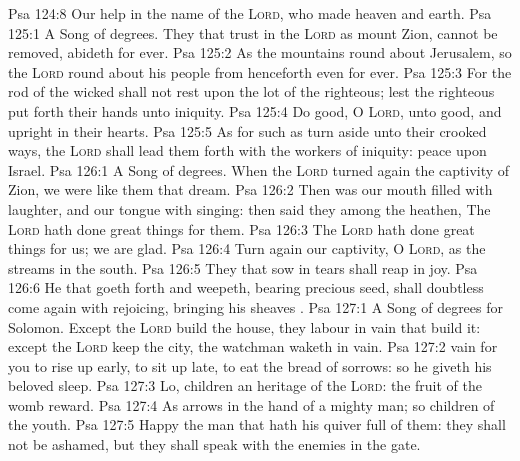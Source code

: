 \vs Psa 124:8 Our help  in the name of the \textsc{Lord}, who made heaven and earth.
\vs Psa 125:1 A Song of degrees. They that trust in the \textsc{Lord}  as mount Zion,  cannot be removed,  abideth for ever.
\vs Psa 125:2 As the mountains  round about Jerusalem, so the \textsc{Lord}  round about his people from henceforth even for ever.
\vs Psa 125:3 For the rod of the wicked shall not rest upon the lot of the righteous; lest the righteous put forth their hands unto iniquity.
\vs Psa 125:4 Do good, O \textsc{Lord}, unto  good, and  upright in their hearts.
\vs Psa 125:5 As for such as turn aside unto their crooked ways, the \textsc{Lord} shall lead them forth with the workers of iniquity:  peace  upon Israel.
\vs Psa 126:1 A Song of degrees. When the \textsc{Lord} turned again the captivity of Zion, we were like them that dream.
\vs Psa 126:2 Then was our mouth filled with laughter, and our tongue with singing: then said they among the heathen, The \textsc{Lord} hath done great things for them.
\vs Psa 126:3 The \textsc{Lord} hath done great things for us;  we are glad.
\vs Psa 126:4 Turn again our captivity, O \textsc{Lord}, as the streams in the south.
\vs Psa 126:5 They that sow in tears shall reap in joy.
\vs Psa 126:6 He that goeth forth and weepeth, bearing precious seed, shall doubtless come again with rejoicing, bringing his sheaves .
\vs Psa 127:1 A Song of degrees for Solomon. Except the \textsc{Lord} build the house, they labour in vain that build it: except the \textsc{Lord} keep the city, the watchman waketh  in vain.
\vs Psa 127:2  vain for you to rise up early, to sit up late, to eat the bread of sorrows:  so he giveth his beloved sleep.
\vs Psa 127:3 Lo, children  an heritage of the \textsc{Lord}:  the fruit of the womb  reward.
\vs Psa 127:4 As arrows  in the hand of a mighty man; so  children of the youth.
\vs Psa 127:5 Happy  the man that hath his quiver full of them: they shall not be ashamed, but they shall speak with the enemies in the gate.
